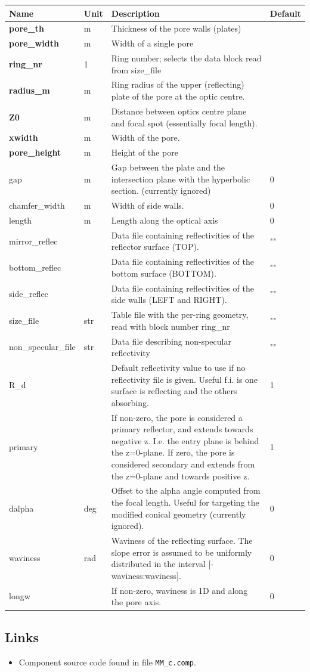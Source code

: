 \begin{longtable}{p{}p{}p{}p{}}
\toprule
\textbf{Name} & \textbf{Unit} & \textbf{Description} & \textbf{Default} \\
\midrule
\endhead
\textbf{pore\_th} & m & Thickness of the pore walls (plates) &  \\
\textbf{pore\_width} & m & Width of a single pore &  \\
\textbf{ring\_nr} & 1 & Ring number; selects the data block read from size\_file &  \\
\textbf{radius\_m} & m & Ring radius of the upper (reflecting) plate of the pore at the optic centre. &  \\
\textbf{Z0} & m & Distance between optics centre plane and focal spot (essentially focal length). &  \\
\textbf{xwidth} & m & Width of the pore. &  \\
\textbf{pore\_height} & m & Height of the pore &  \\
gap & m & Gap between the plate and the intersection plane with the hyperbolic section. (currently ignored) & 0 \\
chamfer\_width & m & Width of side walls. & 0 \\
length & m & Length along the optical axis & 0 \\
mirror\_reflec &   & Data file containing reflectivities of the reflector surface (TOP). & "" \\
bottom\_reflec &   & Data file containing reflectivities of the bottom surface (BOTTOM). & "" \\
side\_reflec &   & Data file containing reflectivities of the side walls (LEFT and RIGHT). & "" \\
size\_file & str & Table file with the per-ring geometry, read with block number ring\_nr & "" \\
non\_specular\_file & str & Data file describing non-specular reflectivity & "" \\
R\_d &   & Default reflectivity value to use if no reflectivity file is given. Useful f.i. is one surface is reflecting and the others absorbing. & 1 \\
primary &   & If non-zero, the pore is considered a primary reflector, and extends towards negative z. I.e. the entry plane is behind the z=0-plane. If zero, the pore is considered secondary and extends from the z=0-plane and towards positive z. & 1 \\
dalpha & deg & Offset to the alpha angle computed from the focal length. Useful for targeting the modified conical geometry (currently ignored). & 0 \\
waviness & rad & Waviness of the reflecting surface. The slope error is assumed to be uniformly distributed in the interval [-waviness:waviness]. & 0 \\
longw &   & If non-zero, waviness is 1D and along the pore axis. & 0 \\
\bottomrule
\end{longtable}

\subsection*{Links}
\begin{itemize}
  \item Component source code found in file \texttt{MM\_c.comp}.
\end{itemize}
